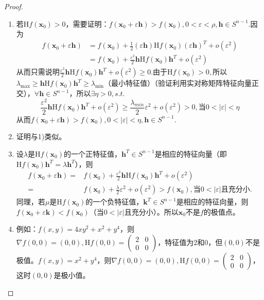 \documentclass[UTF8]{ctexart}
\newcommand{\x}{\boldsymbol{x}}
\begin{document}
    \begin{proof}
        \begin{enumerate}[1)]
            \item 若$\mathrm{H}f(\boldsymbol{x}_0)>0$，需要证明：$f(\x_0+\varepsilon\boldsymbol{h})>f(\x_0),0<\varepsilon<\rho,\boldsymbol{h}\in S^{n-1}$.因为
            \begin{align*}
                f(\x_0+\varepsilon\boldsymbol{h})&=f(\x_0)+\frac{1}{2}(\varepsilon\boldsymbol{h})\mathrm{H}f(\x_0)(\varepsilon\boldsymbol{h})^T+o(\varepsilon^2)\\
                &=f(\x_0)+\frac{\varepsilon^2}{2}\boldsymbol{h}\mathrm{H}f(\x_0)\boldsymbol{h}^T+o(\varepsilon^2)
            \end{align*}
            从而只需说明$\frac{\varepsilon^2}{2}\boldsymbol{h}\mathrm{H}f(\x_0)\boldsymbol{h}^T+o(\varepsilon^2)\ge 0$.由于$\mathrm{H}f(\x_0)>0,$所以$\lambda_{\max}\ge \boldsymbol{h}\mathrm{H}f(\x_0)\boldsymbol{h}^T\ge \lambda_{\min}$（最小特征值）（验证利用实对称矩阵特征向量正交），$\forall\boldsymbol{h}\in S^{n-1}$，所以$\exists\eta>0,s.t.$ $$\frac{\varepsilon^2}{2}\boldsymbol{h}\mathrm{H}f(\x_0)\boldsymbol{h}^T+o(\varepsilon^2)\ge \frac{\lambda_{min}}{2}\varepsilon^2+o(\varepsilon^2)>0,\text{当}0<|\varepsilon|<\eta$$
            从而$f(\x_0+\varepsilon\boldsymbol{h})>f(\x_0),0<|\varepsilon|<\eta,\boldsymbol{h}\in S^{n-1}$.
            \item 证明与1)类似。
            \item 设$\lambda$是$\mathrm{H}f(\x_0)$的一个正特征值，$\boldsymbol{h}^T\in S^{n-1}$是相应的特征向量（即$\mathrm{H}f(\x_0)\boldsymbol{h}^T=\lambda\boldsymbol{h}^T$），则
            \begin{align*}
                f(\x_0+\varepsilon\boldsymbol{h})=&f(\x_0)+\frac{\varepsilon^2}{2}\boldsymbol{h}\mathrm{H}f(\x_0)\boldsymbol{h}^T+o(\varepsilon^2)\\
                =&f(\x_0)+\frac{\lambda}{2}\varepsilon^2+o(\varepsilon^2)>f(\x_0),\text{当}0<|\varepsilon|\text{且充分小}.
            \end{align*}
            同理，若$\mu$是$\mathrm{H}f(\x_0)$的一个负特征值，$\boldsymbol{k}^T\in S^{n-1}$是相应的特征向量，则$f(\x_0+\varepsilon\boldsymbol{k})<f(\x_0)$（当$0<|\varepsilon|$且充分小）。所以$\x_0$不是$f$的极值点。
            \item 例如：$f(x,y)=4xy^2+x^2+y^4$，则$\nabla f(0,0)=(0,0),\mathrm{H}f(0,0)=\begin{pmatrix}
                2&0\\
                0&0
            \end{pmatrix}$，特征值为$2$和$0$，但$(0,0)$不是极值。$f(x,y)=x^2+y^4$，则$\nabla f(0,0)=(0,0),\mathrm{H}f(0,0)=\begin{pmatrix}
                2&0\\
                0&0
            \end{pmatrix}$，这时$(0,0)$是极小值。
        \end{enumerate}
    \end{proof}
\end{document}
